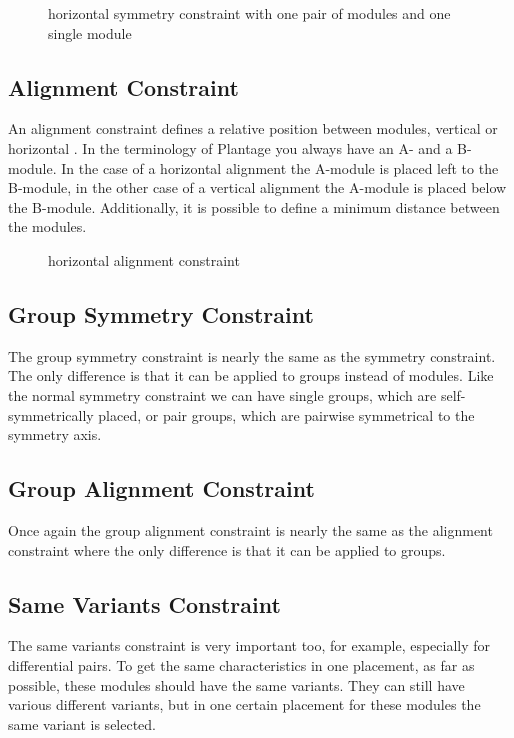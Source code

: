 \begin{figure}
	\centering
	
	\caption{horizontal symmetry constraint with one pair of modules and one single module}
	\label{fig:constraint_symmetry}
\end{figure}

\subsection{Alignment Constraint}
An alignment constraint defines a relative position between modules, vertical or horizontal . In the terminology of Plantage you always have an A- and a B-module. In the case of a horizontal alignment the A-module is placed left to the B-module, in the other case of a vertical alignment the A-module is placed below the B-module. Additionally, it is possible to define a minimum distance between the modules.

\begin{figure}
	\centering
	
	\caption{horizontal alignment constraint}
	\label{fig:constraint_alignment}
\end{figure}

\subsection{Group Symmetry Constraint}
The group symmetry constraint is nearly the same as the symmetry constraint. The only difference is that it can be applied to groups instead of modules. Like the normal symmetry constraint we can have single groups, which are self-symmetrically placed, or pair groups, which are pairwise symmetrical to the symmetry axis.

\subsection{Group Alignment Constraint}
Once again the group alignment constraint is nearly the same as the alignment constraint where the only difference is that it can be applied to groups.

\subsection{Same Variants Constraint}
The same variants constraint is very important too, for example, especially for differential pairs. To get the same characteristics in one placement, as far as possible, these modules should have the same variants. They can still have various different variants, but in one certain placement for these modules the same variant is selected.


